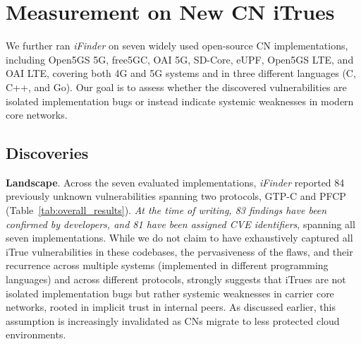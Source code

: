 \section{Measurement on New CN iTrues}
\label{sec:measurement}

We further ran \textit{iFinder} on seven widely used open-source CN implementations, including Open5GS 5G, free5GC, OAI 5G, SD-Core, eUPF, Open5GS LTE, and OAI LTE, covering both 4G and 5G systems and in three different languages (C, C++, and Go). Our goal is to assess whether the discovered vulnerabilities are isolated implementation bugs or instead indicate systemic weaknesses in modern core networks.

\subsection{Discoveries}

\begin{table}[!t]
  \centering
  \caption{Vulnerability discovery results by implementation.}
  \label{tab:overall_results}
\end{table}

\noindent\textbf{Landscape}. Across the seven evaluated implementations, \textit{iFinder} reported 84 previously unknown vulnerabilities spanning two protocols, GTP-C and PFCP (Table~\ref{tab:overall_results}). \textit{At the time of writing, 83 findings have been confirmed by developers, and 81 have been assigned CVE identifiers}, spanning all seven implementations. 
While we do not claim to have exhaustively captured all iTrue vulnerabilities in these codebases, the pervasiveness of the flaws, and their recurrence across multiple systems (implemented in different programming languages) and across different protocols, strongly suggests that iTrues are not isolated implementation bugs but rather systemic weaknesses in carrier core networks, rooted in implicit trust in internal peers. As discussed earlier, this assumption is increasingly invalidated as CNs migrate to less protected cloud environments.

